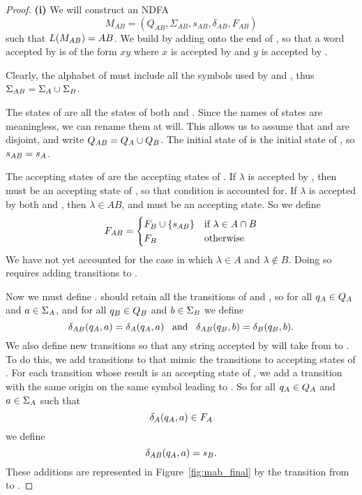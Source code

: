 \documentclass{bcthesis}
\begin{document}
\begin{proof}
		\noindent \textbf{(i)} \hspace{\parindent}
		We will construct an NDFA 
		\[
			M_{AB} = (Q_{AB}, \Sigma_{AB}, s_{AB}, \delta_{AB}, F_{AB})
		\]
		such that $L(M_{AB}) = AB$.
		We build \mab by adding \mb onto the end of \ma, so that a word accepted by \mab is of the form $xy$ where $x$ is accepted by \ma and $y$ is accepted by \mb.

		Clearly, the alphabet of \mab must include all the symbols used by \ma and \mb, thus $\Sigma_{AB} = \Sigma_A \cup \Sigma_B$.
		
		The states of \mab are all the states of both \ma and \mb.
		Since the names of states are meaningless, we can rename them at will. 
		This allows us to assume that \qa and \qb are disjoint, and write $Q_{AB} = Q_A \cup Q_B$.
		The initial state of \mab is the initial state of \ma, so $s_{AB} = s_A$.

		The accepting states of \mab are the accepting states of \mb.
		If $\lambda$ is accepted by \mb, then \sb must be an accepting state of \mb, so that condition is accounted for.
		If $\lambda$ is accepted by both \ma and \mb, then $\lambda \in AB$, and \sab must be an accepting state.
		So we define
		\[
			F_{AB} = 	\begin{cases}
						F_B \cup \{ s_{AB} \} &\text{if } \lambda \in A \cap B \\
						F_B &\text{otherwise}
					\end{cases}
		\]
		We have not yet accounted for the case in which $\lambda \in A$ and $\lambda \notin B$.
		Doing so requires adding transitions to \mab.

		Now we must define \dalab.
		\mab should retain all the transitions of \ma and \mb, so for all $q_A \in Q_A$ and $a \in \Sigma_A$, and for all $q_B \in Q_B$ and $b \in \Sigma_B$ we define
		\[
			\delta_{AB}(q_A, a) = \delta_A(q_A, a) \enspace \text{ and } \enspace \delta_{AB}(q_B, b) = \delta_B(q_B, b).
		\]
		We also define new transitions so that any string accepted by \ma will take \mab from \sab to \sb.
		To do this, we add transitions to \sb that mimic the transitions to accepting states of \ma.
		For each transition whose result is an accepting state of \ma, we add a transition with the same origin on the same symbol leading to \sb.
		So for all $q_A \in Q_A$ and $a \in \Sigma_A$ such that 
		\[
			\delta_A(q_A, a) \in F_A
		\]
		we define
		\[
			\delta_{AB}(q_A, a) = s_B.
		\]
		These additions are represented in Figure~\ref{fig:mab_final} by the transition from \ma to \sb.


\end{proof}
\end{document}
